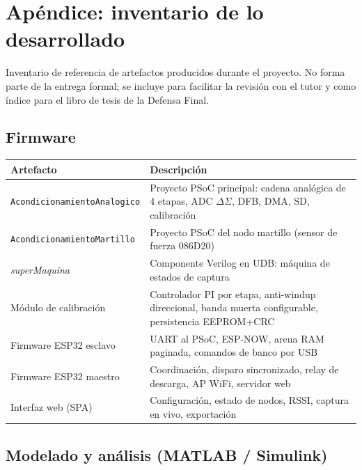 \section{Ap\'endice: inventario de lo desarrollado}
\label{sec:inventario}

Inventario de referencia de artefactos producidos durante el proyecto. No forma parte de
la entrega formal; se incluye para facilitar la revisi\'on con el tutor y como \'indice
para el libro de tesis de la Defensa Final.

\subsection{Firmware}

\begin{center}\footnotesize
\begin{tabularx}{\textwidth}{@{}l X@{}}
\toprule
\textbf{Artefacto} & \textbf{Descripci\'on} \\
\midrule
\texttt{AcondicionamientoAnalogico} & Proyecto PSoC principal: cadena anal\'ogica de 4 etapas, ADC $\Delta\Sigma$, DFB, DMA, SD, calibraci\'on \\
\texttt{AcondicionamientoMartillo} & Proyecto PSoC del nodo martillo (sensor de fuerza 086D20) \\
\emph{superMaquina} & Componente Verilog en UDB: m\'aquina de estados de captura \\
M\'odulo de calibraci\'on & Controlador PI por etapa, anti-windup direccional, banda muerta configurable, persistencia EEPROM+CRC \\
Firmware ESP32 esclavo & UART al PSoC, ESP-NOW, arena RAM paginada, comandos de banco por USB \\
Firmware ESP32 maestro & Coordinaci\'on, disparo sincronizado, relay de descarga, AP WiFi, servidor web \\
Interfaz web (SPA) & Configuraci\'on, estado de nodos, RSSI, captura en vivo, exportaci\'on \\
\bottomrule
\end{tabularx}
\end{center}

\subsection{Modelado y an\'alisis (MATLAB / Simulink)}

